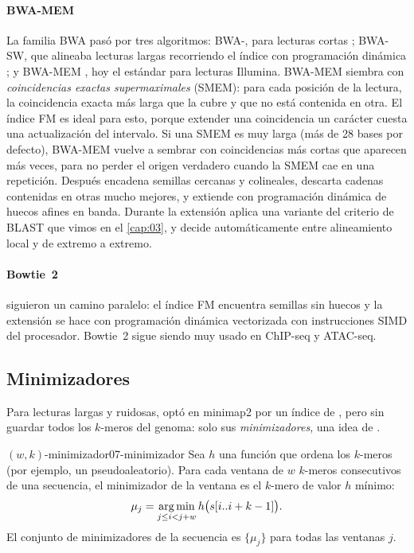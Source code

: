 \paragraph{BWA-MEM} La familia BWA pasó por tres algoritmos: BWA-, para lecturas cortas \parencite{c07-li2009bwa}; BWA-SW, que alineaba lecturas largas recorriendo el índice con programación dinámica \parencite{c07-li2010bwasw}; y BWA-MEM \parencite{c07-li2013}, hoy el estándar para lecturas Illumina. BWA-MEM siembra con \emph{coincidencias exactas supermaximales} (SMEM): para cada posición de la lectura, la coincidencia exacta más larga que la cubre y que no está contenida en otra. El índice FM es ideal para esto, porque extender una coincidencia un carácter cuesta una actualización del intervalo. Si una SMEM es muy larga (más de 28 bases por defecto), BWA-MEM vuelve a sembrar con coincidencias más cortas que aparecen más veces, para no perder el origen verdadero cuando la SMEM cae en una repetición. Después encadena semillas cercanas y colineales, descarta cadenas contenidas en otras mucho mejores, y extiende con programación dinámica de huecos afines en banda. Durante la extensión aplica una variante del criterio  de BLAST que vimos en el \cref{cap:03}, y decide automáticamente entre alineamiento local y de extremo a extremo.

\paragraph{Bowtie~2} \textcite{c07-langmead2012} siguieron un camino paralelo: el índice FM encuentra semillas sin huecos y la extensión se hace con programación dinámica vectorizada con instrucciones SIMD del procesador. Bowtie~2 sigue siendo muy usado en ChIP-seq y ATAC-seq.

\subsection{Minimizadores}

Para lecturas largas y ruidosas, \textcite{c07-li2018} optó en minimap2 por un índice de , pero sin guardar todos los $k$-meros del genoma: solo sus \emph{minimizadores}, una idea de \textcite{c07-roberts2004}.

\begin{definicion}{$(w,k)$-minimizador}{07-minimizador}
Sea $h$ una función que ordena los $k$-meros (por ejemplo, un  pseudoaleatorio). Para cada ventana de $w$ $k$-meros consecutivos de una secuencia, el minimizador de la ventana es el $k$-mero de valor $h$ mínimo:
\begin{equation}\label{eq:07-minimizador}
\mu_j = \operatorname*{arg\,min}_{j\le i<j+w} h\big(s[i..i+k-1]\big).
\end{equation}
El conjunto de minimizadores de la secuencia es $\{\mu_j\}$ para todas las ventanas $j$.
\end{definicion}


